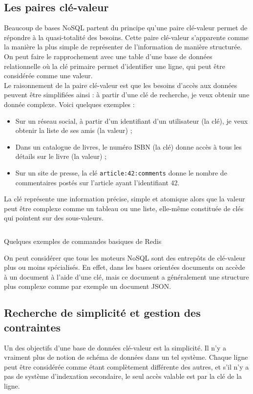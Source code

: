 \subsection{Les paires clé-valeur}
	Beaucoup de bases NoSQL partent du principe qu'une paire clé-valeur permet de répondre à la quasi-totalité des besoins. Cette paire clé-valeur s'apparente comme la manière la plus simple de représenter de l'information de manière structurée. On peut faire le rapprochement avec une table d'une base de données relationnelle où la clé primaire permet d'identifier une ligne, qui peut être considérée comme une valeur.\\

	Le raisonnement de la paire clé-valeur est que les besoins d'accès aux données peuvent être simplifiées ainsi : à partir d'une clé de recherche, je veux obtenir une donnée complexe. Voici quelques exemples :
	\begin{itemize}
		\item Sur un réseau social, à partir d'un identifiant d'un utilisateur (la clé), je veux obtenir la liste de ses amis (la valeur) ;
		\item Dans un catalogue de livres, le numéro ISBN (la clé) donne accès à tous les détails sur le livre (la valeur) ;
		\item Sur un site de presse, la clé \texttt{article:42:comments} donne le nombre de commentaires postés sur l'article ayant l'identifiant 42.
	\end{itemize}
	\vspace{20px}

	La clé représente une information précise, simple et atomique alors que la valeur peut être complexe comme un tableau ou une liste, elle-même constituée de clés qui pointent sur des sous-valeurs.\\

	\begin{listing}[H]
		\inputminted{text}{code/commandesRedis.txt}
		\caption{Quelques exemples de commandes basiques de Redis}
	\end{listing}

	On peut considérer que tous les moteurs NoSQL sont des entrepôts de clé-valeur plus ou moins spécialisés. En effet, dans les bases orientées documents on accède à un document à l'aide d'une clé, mais ce document a généralement une structure plus complexe comme par exemple un document JSON.

\subsection{Recherche de simplicité et gestion des contraintes}
	Un des objectifs d'une base de données clé-valeur est la simplicité. Il n'y a vraiment plus de notion de schéma de données dans un tel système. Chaque ligne peut être considérée comme étant complètement différente des autres, et s'il n'y a pas de système d'indexation secondaire, le seul accès valable est par la clé de la ligne.\\

